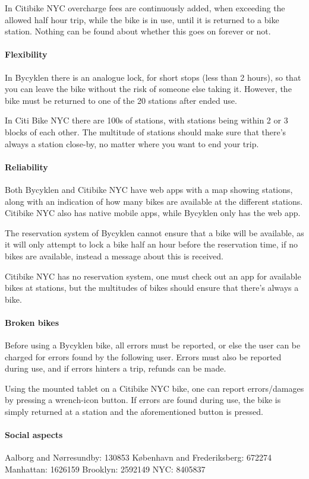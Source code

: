 In Citibike NYC overcharge fees are continuously added, when exceeding the allowed half hour trip, while the bike is in use, until it is returned to a bike station.
Nothing can be found about whether this goes on forever or not.

\paragraph{Flexibility}
In Bycyklen there is an analogue lock, for short stops (less than 2 hours), so that you can leave the bike without the risk of someone else taking it.
However, the bike must be returned to one of the 20 stations after ended use.

In Citi Bike NYC there are 100s of stations, with stations being within 2 or 3 blocks of each other.
The multitude of stations should make sure that there's always a station close-by, no matter where you want to end your trip.

\paragraph{Reliability}
Both Bycyklen and Citibike NYC have web apps with a map showing stations, along with an indication of how many bikes are available at the different stations.
Citibike NYC also has native mobile apps, while Bycyklen only has the web app.

The reservation system of Bycyklen cannot ensure that a bike will be available, as it will only attempt to lock a bike half an hour before the reservation time, if no bikes are available, instead a message about this is received.

Citibike NYC has no reservation system, one must check out an app for available bikes at stations, but the multitudes of bikes should ensure that there's always a bike.

\paragraph{Broken bikes}
Before using a Bycyklen bike, all errors must be reported, or else the user can be charged for errors found by the following user.
Errors must also be reported during use, and if errors hinters a trip, refunds can be made.

Using the mounted tablet on a Citibike NYC bike, one can report errors/damages by pressing a wrench-icon button.
If errors are found during use, the bike is simply returned at a station and the aforementioned button is pressed.

\paragraph{Social aspects}
Aalborg and Nørresundby: 130853
København and Frederiksberg: 672274
\cite{bef44}
Manhattan: 1626159
Brooklyn: 2592149
NYC: 8405837
\cite{nyc}
